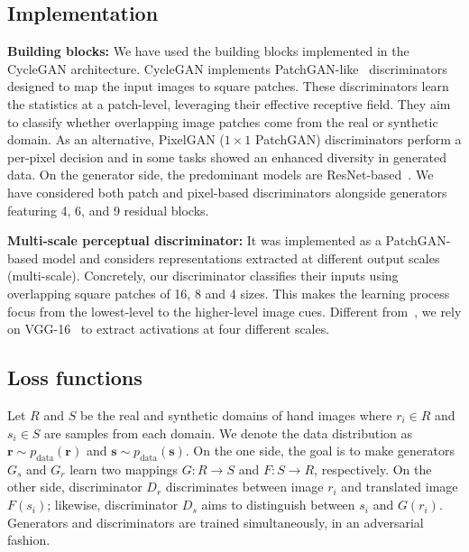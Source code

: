 \subsection{Implementation}

\vspace*{0.1cm}\noindent\textbf{Building blocks:} We have used the building blocks implemented in the \ac{CycleGAN} architecture. \ac{CycleGAN} implements PatchGAN-like~\cite{Isola2017} discriminators designed to map the input images to square patches. These discriminators learn the statistics at a patch-level, leveraging their effective receptive field. They aim to classify whether overlapping image patches come from the real or synthetic domain. As an alternative, PixelGAN ($1 \times 1$ PatchGAN) discriminators perform a per-pixel decision and in some tasks showed an enhanced diversity in generated data. On the generator side, the predominant models are ResNet-based~\cite{He2016}. We have considered both patch and pixel-based discriminators alongside generators featuring 4, 6, and 9 residual blocks.

\vspace*{0.1cm}\noindent\textbf{Multi-scale perceptual discriminator:} It was implemented as a PatchGAN-based model and considers representations extracted at different output scales (multi-scale). Concretely, our discriminator classifies their inputs using overlapping square patches of 16, 8 and 4 sizes. This makes the learning process focus from the lowest-level to the higher-level image cues. Different from~\cite{Sungatullina2018}, we rely on VGG-16~\cite{Simonyan2015} to extract activations at four different scales.

\subsection{Loss functions}
Let $R$ and $S$ be the real and synthetic domains of hand images where $r_i\in R$ and $s_i\in S$ are samples from each domain. We denote the data distribution as $\boldsymbol{r} \sim p_{\mathrm{data}}(\boldsymbol{r})$ and $\boldsymbol{s} \sim p_{\mathrm{data}}(\boldsymbol{s})$. On the one side, the goal is to make generators $G_s$ and $G_r$ learn two mappings $G:R\to S$ and $F:S\to R$, respectively. On the other side, discriminator $D_r$ discriminates between image $r_i$ and translated image $F(s_i)$; likewise, discriminator $D_s$ aims to distinguish between $s_i$ and $G(r_i)$. Generators and discriminators are trained simultaneously, in an adversarial fashion. 

